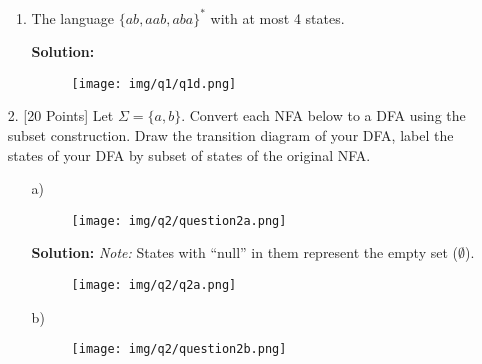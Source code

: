 \documentclass[12pt]{article}
\begin{document}
\begin{spacing}{1.5}
\begin{enumerate}
\begin{enumerate}
                        \item The language $\{ab,aab,aba \}^*$ with at most 4 states.

                              \textbf{Solution:}

                              \begin{figure}[h!]
                                    \centering
                                    \texttt{[image: img/q1/q1d.png]}
                              \end{figure}

                  \end{enumerate}

                  \newpage
            \item[2.] [20 Points] Let $\Sigma = \{a,b \}$. Convert each NFA below to a DFA using the subset construction. Draw the transition diagram of your DFA, label the states of your DFA by subset of states of the original NFA.

                  \begin{enumerate}
                        \item[] a)
                              \begin{figure}[h!]
                                    \centering
                                    \texttt{[image: img/q2/question2a.png]}
                              \end{figure}

                              \textbf{Solution:} \textit{Note:} States with ``null'' in them represent the empty set ($\emptyset$).

                              \begin{figure}[h!]
                                    \centering
                                    \texttt{[image: img/q2/q2a.png]}
                              \end{figure}

                              \newpage

                        \item[] b)
                              \begin{figure}[h!]
                                    \centering
                                    \texttt{[image: img/q2/question2b.png]}
                              \end{figure}


\end{enumerate}
\end{enumerate}
\end{spacing}
\end{document}
